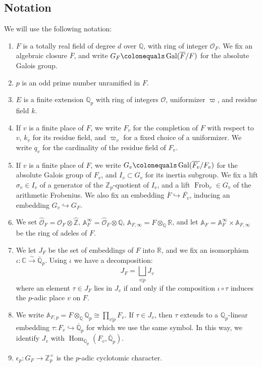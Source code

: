 \documentclass[a4paper, notitlepage, 10pt]{amsart}
\theoremstyle{plain} %
\theoremstyle{definition} %
\theoremstyle{remark} %
\numberwithin{equation}{section}
\newcommand{\bbQ}{\mathbb Q}
\newcommand{\bbZ}{\mathbb Z}
\newcommand{\Frob}{\operatorname{Frob}} %
\newcommand{\Gal}{\operatorname{Gal}} %
\newcommand{\Hom}{\operatorname{Hom}} %
\begin{document}
\subsection*{Notation}
We will use the following notation:
\begin{enumerate}
\item  $F$ is a totally real field of degree $d$ over $\mathbb{Q}$, with ring of integer $\mathcal{O}_F$. We fix an algebraic closure $\overline{F}$, and write $G_F\colonequals \Gal(\overline{F}/F)$ for the absolute Galois group.
\item $p$ is an odd prime number unramified in $F$.
\item $E$ is a finite extension $\bbQ_p$ with ring of integers $\mathcal{O}$, uniformizer $\varpi$, and residue field $k$.
    \item If $v$ is a finite place of $F$, we write $F_v$ for the completion of $F$ with respect to $v$, $k_v$ for its residue field, and $\varpi_v$ for a fixed choice of a uniformizer. We write $q_v$ for the cardinality of the residue field of $F_v$.
    \item If $v$ is a finite place of $F$, we write $G_v\colonequals \Gal(\overline{F_v}/F_v)$ for the absolute Galois group of $F_v$, and $I_v\subset G_v$ for its inertia subgroup. We fix a lift $\sigma_v\in I_v$ of a generator of the $\bbZ_p$-quotient of $I_v$, and a lift $\Frob_v\in G_v$ of the arithmetic Frobenius.
     We also fix an embedding $\overline{F}\hookrightarrow \overline{F_v}$, inducing an embedding $G_v\hookrightarrow G_F$.
    \item We set  $\widehat{\mathcal{O}}_F=\mathcal{O}_F\otimes \widehat{\mathbb{Z}}$, $\mathbb{A}_{F}^\infty=\widehat{\mathcal{O}}_F\otimes \mathbb{Q}$, $\mathbb{A}_{F,\infty}= F\otimes_{\mathbb{Q}} \mathbb{R}$, and let $\mathbb{A}_F=\mathbb{A}_{F}^\infty\times \mathbb{A}_{F,\infty}$ be the ring of adeles of $F$.
    \item  We let $J_F$ be the set of embeddings of $F$ into $\mathbb{R}$, and we fix an isomorphism $\iota\colon \mathbb{C}\xrightarrow{\sim}\overline{\mathbb{Q}}_p$. Using $\iota$ we have a decomposition:
$$ J_F=\bigsqcup_{v|p} J_v $$
where an element $\tau\in J_F$ lies in $J_v$ if and only if the composition $\iota\circ \tau$ induces the $p$-adic place $v$ on $F$.
\item We write $\mathbb{A}_{F,p}=F\otimes_{\mathbb{Q}}\mathbb{Q}_p\cong \prod_{v|p}F_v$. If $\tau\in J_v$, then $\tau$ extends to a $\mathbb{Q}_p$-linear embedding $\tau\colon  F_v\hookrightarrow \overline{\mathbb{Q}}_p$ for which we use the same symbol. In this way, we identify $J_v$ with $\Hom_{\mathbb{Q}_p}(F_v,\overline{\mathbb{Q}}_p)$.
\item $\epsilon_p\colon G_F\rightarrow \mathbb{Z}_p^\times$ is the $p$-adic cyclotomic character. 


\end{enumerate}
\end{document}
